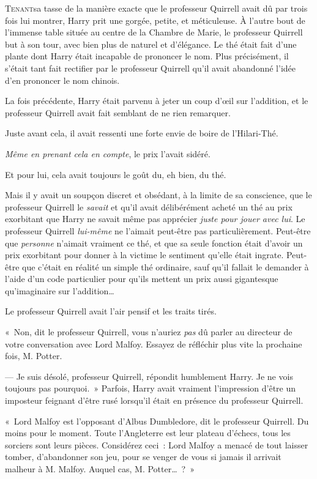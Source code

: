 
\lettrine{T}{enant}sa tasse de la manière exacte que le professeur Quirrell avait dû par trois fois lui montrer, Harry prit une gorgée, petite, et méticuleuse.
À l'autre bout de l'immense table située au centre de la Chambre de Marie, le professeur Quirrell but à son tour, avec bien plus de naturel et d'élégance.
Le thé était fait d'une plante dont Harry était incapable de prononcer le nom.
Plus précisément, il s'était tant fait rectifier par le professeur Quirrell qu'il avait abandonné l'idée d'en prononcer le nom chinois.

La fois précédente, Harry était parvenu à jeter un coup d'œil sur l'addition, et le professeur Quirrell avait fait semblant de ne rien remarquer.

Juste avant cela, il avait ressenti une forte envie de boire de l'Hilari-Thé.

\emph{Même en prenant cela en compte}, le prix l'avait sidéré.

Et pour lui, cela avait toujours le goût du, eh bien, du thé.

Mais il y avait un soupçon discret et obsédant, à la limite de sa conscience, que le professeur Quirrell le \emph{savait} et qu'il avait délibérément acheté un thé au prix exorbitant que Harry ne savait même pas apprécier \emph{juste pour jouer avec lui}.
Le professeur Quirrell \emph{lui-même} ne l'aimait peut-être pas particulièrement.
Peut-être que \emph{personne} n'aimait vraiment ce thé, et que sa seule fonction était d'avoir un prix exorbitant pour donner à la victime le sentiment qu'elle était ingrate.
Peut-être que c'était en réalité un simple thé ordinaire, sauf qu'il fallait le demander à l'aide d'un code particulier pour qu'ils mettent un prix aussi gigantesque qu'imaginaire sur l'addition…

Le professeur Quirrell avait l'air pensif et les traits tirés.

«~Non, dit le professeur Quirrell, vous n'auriez \emph{pas} dû parler au directeur de votre conversation avec Lord Malfoy.
Essayez de réfléchir plus vite la prochaine fois, M. Potter.

--- Je suis désolé, professeur Quirrell, répondit humblement Harry.
Je ne vois toujours pas pourquoi.~»
Parfois, Harry avait vraiment l'impression d'être un imposteur feignant d'être rusé lorsqu'il était en présence du professeur Quirrell.

«~Lord Malfoy est l'opposant d'Albus Dumbledore, dit le professeur Quirrell.
Du moins pour le moment.
Toute l'Angleterre est leur plateau d'échecs, tous les sorciers sont leurs pièces.
Considérez ceci~: Lord Malfoy a menacé de tout laisser tomber, d'abandonner son jeu, pour se venger de vous si jamais il arrivait malheur à M. Malfoy.
Auquel cas, M. Potter…~?~»

